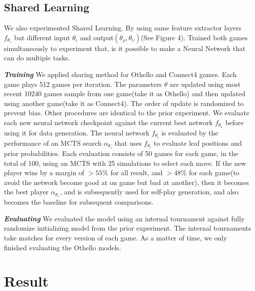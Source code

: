 \documentclass[12pt,a4paper]{article}
\begin{document}
\subsection{Shared Learning}
\hspace{0.6cm} We also experimented Shared Learning. By using same feature extractor layers \(f_{\theta_\gamma}\) but different input \(\theta_\iota\) and output\((\theta_\rho, \theta_\upsilon)\)(See Figure 4). Trained both games simultaneously to experiment that, is it possible to make a Neural Network that can do multiple tasks.\par
\textit{\textbf{Training}} We applied sharing method for Othello and Connect4 games. Each game plays 512 games per iteration. The parameters \(\theta\) are updated using most recent 10240 games sample from one game(take it as Othello) and then updated using another game(take it as Connect4). The order of update is randomized to prevent bias. Other procedures are identical to the prior experiment. We evaluate each new neural network checkpoint against the current best network \(f_{\theta_∗}\) before using it for data generation. The neural network \(f_{\theta_i}\) is evaluated by the performance of an MCTS search \(\alpha_{\theta_i}\) that uses \(f_{\theta_i}\) to evaluate leaf positions and prior probabilities. Each evaluation consists of 50 games for each game, in the total of 100, using an MCTS with 25 simulations to select each move. If the new player wins by a margin of \(> 55\%\) for all result, and \(> 48\%\) for each game(to avoid the network become good at on game but bad at another), then it becomes the best player \(\alpha_{\theta_∗}\), and is subsequently used for self-play generation, and also becomes the baseline for subsequent comparisons.\par
\textit{\textbf{Evaluating}} We evaluated the model using an internal tournament against fully randomize initializing model from the prior experiment. The internal tournaments take matches for every version of each game. As a matter of time, we only finished evaluating the Othello models.

\clearpage
\section{Result}
\end{document}
